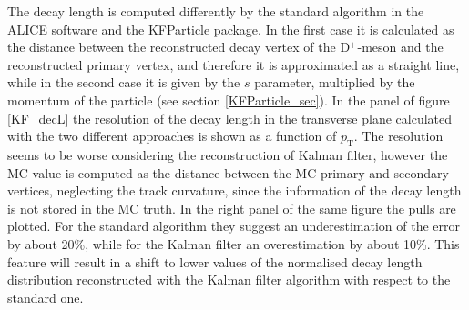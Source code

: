 \documentclass[b5paper,10pt,twoside,oldstyle,classica]{toptesi}
\newcommand{\pt}{p_\text{T}}
\begin{document}
The decay length is computed differently by the standard algorithm in the ALICE software and the KFParticle package. In the first case it is calculated as the distance between the reconstructed decay vertex of the D$^+$-meson and the reconstructed primary vertex, and therefore it is approximated as a straight line, while in the second case it is given by the $s$ parameter, multiplied by the momentum of the particle (see section \ref{KFParticle_sec}). In the panel of figure \ref{KF_decL} the resolution of the decay length in the transverse plane calculated with the two different approaches is shown as a function of $\pt$. The resolution seems to be worse considering the reconstruction of Kalman filter, however the MC value is computed as the distance between the MC primary and secondary vertices, neglecting the track curvature, since the information of the decay length is not stored in the MC truth. In the right panel of the same figure the pulls are plotted. For the standard algorithm they suggest an underestimation of the error by about 20\%, while for the Kalman filter an overestimation by about 10\%. This feature will result in a shift to lower values of the normalised decay length distribution reconstructed with the Kalman filter algorithm with respect to the standard one.  
\end{document}

